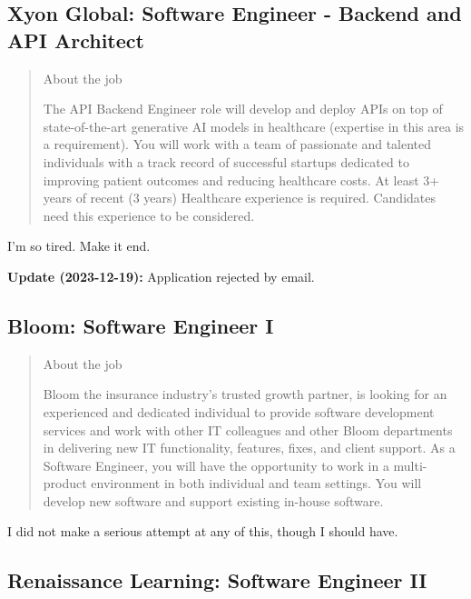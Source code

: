 \documentclass[
	letterpaper, %
	12pt, %
]{CSSullivanBusinessReport}
\begin{document}

\subsection[Xyon Global]{Xyon Global: Software Engineer - Backend and API Architect}

\begin{quote}
	About the job
	
	The API Backend Engineer role will develop and deploy APIs on top of state-of-the-art generative AI models in healthcare (expertise in this area is a requirement). You will work with a team of passionate and talented individuals with a track record of successful startups dedicated to improving patient outcomes and reducing healthcare costs. At least 3+ years of recent (3 years) Healthcare experience is required. Candidates need this experience to be considered. 

\end{quote}

I'm so tired. Make it end. 

\textbf{Update (2023-12-19):} Application rejected by email.


\subsection[Bloom]{Bloom: Software Engineer I}

\begin{quote}
	About the job
	
	Bloom the insurance industry's trusted growth partner, is looking for an experienced and dedicated individual to provide software development services and work with other IT colleagues and other Bloom departments in delivering new IT functionality, features, fixes, and client support. As a Software Engineer, you will have the opportunity to work in a multi-product environment in both individual and team settings. You will develop new software and support existing in-house software.

\end{quote}

I did not make a serious attempt at any of this, though I should have.


\subsection[Renaissance Learning]{Renaissance Learning: Software Engineer II}
\end{document}
